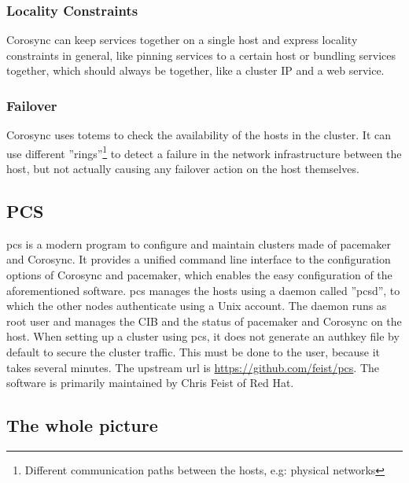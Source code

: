 \subsubsection{Locality Constraints}
Corosync can keep services together on a single host and express locality constraints in general,
like pinning services to a certain host or bundling services together, which should
always be together, like a cluster IP and a web service.
\subsubsection{Failover}
Corosync uses totems\cite{Amir95thetotem} to check the availability of the hosts
in the cluster. It can use different ''rings''\footnote{Different communication
paths between the hosts, e.g: physical networks} to detect a failure
in the network infrastructure between the host, but not actually causing any failover
action on the host themselves.

\subsection{PCS}
\ac{pcs} is a modern program to configure and maintain clusters made of pacemaker and Corosync. It provides a unified command line interface to the configuration options of Corosync and pacemaker, which enables the easy configuration of the aforementioned software. pcs manages
the hosts using a daemon called ''pcsd'', to which the other nodes authenticate using a Unix account.
The daemon runs as root user and manages the \ac{CIB} and the status of pacemaker and Corosync on the host.
When setting up a cluster using pcs, it does not generate an authkey file by default to secure the
cluster traffic. This must be done to the user, because it takes several minutes.
The upstream url is \url{https://github.com/feist/pcs}. The software is primarily maintained by Chris Feist of Red Hat.

\subsection{The whole picture}

